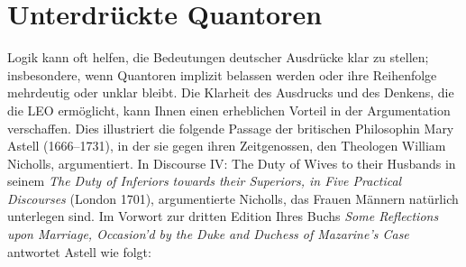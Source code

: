 \section{Unterdrückte Quantoren}\label{ss:SuppQuant}

Logik kann oft helfen, die Bedeutungen deutscher Ausdrücke klar zu stellen; insbesondere, wenn Quantoren implizit belassen werden oder ihre Reihenfolge mehrdeutig oder unklar bleibt. Die Klarheit des Ausdrucks und des Denkens, die die LEO ermöglicht, kann Ihnen einen erheblichen Vorteil in der Argumentation verschaffen. Dies illustriert die folgende Passage der britischen Philosophin Mary Astell (1666--1731), in der sie gegen ihren Zeitgenossen, den Theologen William Nicholls, argumentiert. In Discourse IV: The Duty of Wives to their Husbands in seinem \textit{The Duty of Inferiors towards their Superiors, in Five Practical Discourses} (London 1701), argumentierte Nicholls, das Frauen Männern natürlich unterlegen sind. Im Vorwort zur dritten Edition Ihres Buchs \emph{Some Reflections upon Marriage, Occasion'd by the Duke and Duchess of Mazarine's Case} antwortet Astell wie folgt:
